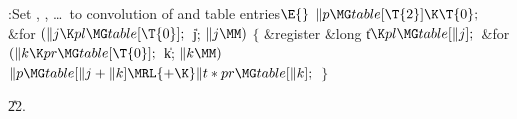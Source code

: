 \B{}:Set , , %
\dots\ to convolution of  and  table entries\X${}\E{}$\6
$\|p\MG\\{table}[\T{2}]\K\T{0};{}$\6
\&{for} ${}(\|j\K\\{pl}\MG\\{table}[\T{0}];{}$ \|j; ${}\|j\MM){}$\5
${}\{{}$\5
\1\&{register} \&{long} \|t${}\K\\{pl}\MG\\{table}[\|j];{}$\7
\&{for} ${}(\|k\K\\{pr}\MG\\{table}[\T{0}];{}$ \|k; ${}\|k\MM){}$\1\5
${}\|p\MG\\{table}[\|j+\|k]\MRL{+{\K}}\|t*\\{pr}\MG\\{table}[\|k];{}$\2\6
\4${}\}{}$\2\par
\U22.\fi

